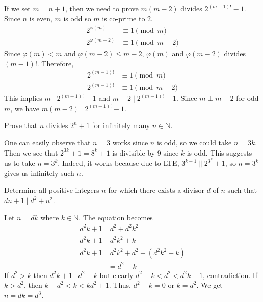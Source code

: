 \documentclass[problems.tex]{subfile}
\begin{document}
	\begin{solution}
		If we set $m=n+1$, then we need to prove $m(m-2)$ divides $2^{(m-1)!}-1$. Since $n$ is even, $m$ is odd so $m$ is co-prime to $2$.
			\begin{align*}
				2^{\varphi(m)} &\equiv1\pmod m\\
				2^{\varphi(m-2)} &\equiv1\pmod{m-2}
			\end{align*}
		Since $\varphi(m)<m$ and $\varphi(m-2)\leq m-2$, $\varphi(m)$ and $\varphi(m-2)$ divides $(m-1)!$. Therefore,
			\begin{align*}
				2^{(m-1)!} & \equiv1\pmod m\\
				2^{(m-1)!} & \equiv1\pmod{m-2}
			\end{align*}
		This implies $m\mid 2^{(m-1)!}-1$ and $m-2\mid 2^{(m-1)!}-1$. Since $m\perp m-2$ for odd $m$, we have $m(m-2)\mid 2^{(m-1)!}-1$.
	\end{solution}




	\begin{problem}
		Prove that $n$ divides $2^n+1$ for infinitely many $n\in\mathbb{N}$.
	\end{problem}

	\begin{solution}
		One can easily observe that $n=3$ works since $n$ is odd, so we could take $n=3k$. Then we see that $2^{3k}+1=8^k+1$ is divisible by $9$ since $k$ is odd. This suggests us to take $n=3^k$. Indeed, it works because due to LTE, $3^{k+1}\|2^{3^k}+1$, so $n=3^k$ gives us infinitely such $n$.
	\end{solution}

	\begin{problem}[Croatia $2015$]
		Determine all positive integers $n$ for which there exists a divisor $d$ of $n$ such that $dn+1\mid d^2+n^2$.
	\end{problem}

	\begin{solution}
		Let $n=dk$ where $k\in\mathbb{N}$. The equation becomes
			\begin{align*}
				d^2k+1 & \mid d^2+d^2k^2\\
				d^2k+1 & \mid d^2k^2+k\\
				d^2k+1 & \mid d^2k^2+d^2-(d^2k^2+k)\\
					   & = d^2-k
			\end{align*}
		If $d^2>k$ then $d^2k+1\mid d^2-k$ but clearly $d^2-k<d^2<d^2k+1$, contradiction. If $k>d^2$, then $k-d^2<k<kd^2+1$. Thus, $d^2-k=0$ or $k=d^2$. We get $n=dk=d^3$.
	\end{solution}
\end{document}
